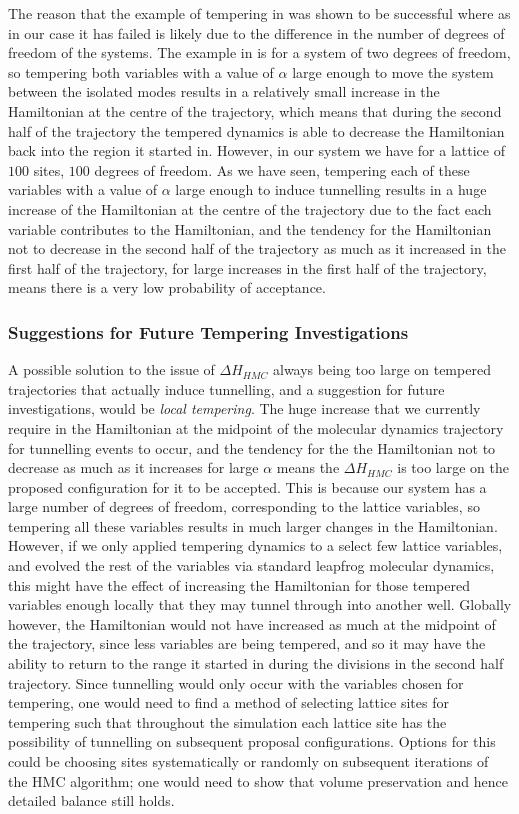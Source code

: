 \documentclass[12pt]{article}
\begin{document}
The reason that the example of tempering in \cite{neal_2011} was shown to be successful where as in our case it has failed is likely due to the difference in the number of degrees of freedom of the systems. The example in \cite{neal_2011} is for a system of two degrees of freedom, so tempering both variables with a value of $\alpha$ large enough to move the system between the isolated modes results in a relatively small increase in the Hamiltonian at the centre of the trajectory, which means that during the second half of the trajectory the tempered dynamics is able to decrease the Hamiltonian back into the region it started in. However, in our system we have for a lattice of $100$ sites, $100$ degrees of freedom. As we have seen, tempering each of these variables with a value of $\alpha$ large enough to induce tunnelling results in a huge increase of the Hamiltonian at the centre of the trajectory due to the fact each variable contributes to the Hamiltonian, and the tendency for the Hamiltonian not to decrease in the second half of the trajectory as much as it increased in the first half of the trajectory, for large increases in the first half of the trajectory, means there is a very low probability of acceptance. 

\subsubsection{Suggestions for Future Tempering Investigations}
A possible solution to the issue of $\Delta H_{HMC}$ always being too large on tempered trajectories that actually induce tunnelling, and a suggestion for future investigations, would be \textit{local tempering}. The huge increase that we currently require in the Hamiltonian at the midpoint of the molecular dynamics trajectory for tunnelling events to occur, and the tendency for the the Hamiltonian not to decrease as much as it increases for large $\alpha$ means the $\Delta H_{HMC}$ is too large on the proposed configuration for it to be accepted. This is because our system has a large number of degrees of freedom, corresponding to the lattice variables, so tempering all these variables results in much larger changes in the Hamiltonian. However, if we only applied tempering dynamics to a select few lattice variables, and evolved the rest of the variables via standard leapfrog molecular dynamics, this might have the effect of increasing the Hamiltonian for those tempered variables enough locally that they may tunnel through into another well. Globally however, the Hamiltonian would not have increased as much at the midpoint of the trajectory, since less variables are being tempered, and so it may have the ability to return to the range it started in during the divisions in the second half trajectory. Since tunnelling would only occur with the variables chosen for tempering, one would need to find a method of selecting lattice sites for tempering such that throughout the simulation each lattice site has the possibility of tunnelling on subsequent proposal configurations. Options for this could be choosing sites systematically or randomly on subsequent iterations of the HMC algorithm; one would need to show that volume preservation and hence detailed balance still holds.
\end{document}
